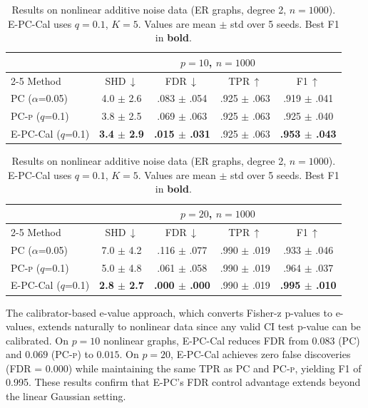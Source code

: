 \documentclass[11pt]{article}
\newcommand{\epc}{\textsc{E-PC}}
\newcommand{\pcp}{\textsc{PC-p}}
\begin{document}
\begin{table}[t]
\caption{Results on nonlinear additive noise data (ER graphs, degree 2, $n = 1000$). \epc{}-Cal uses $q = 0.1$, $K = 5$. Values are mean $\pm$ std over 5 seeds. Best F1 in \textbf{bold}.}
\label{tab:nonlinear}
\centering
\small
\begin{tabular}{l cccc}
\toprule
 & \multicolumn{4}{c}{$p = 10$, $n = 1000$} \\
\cmidrule(lr){2-5}
Method & SHD\,$\downarrow$ & FDR\,$\downarrow$ & TPR\,$\uparrow$ & F1\,$\uparrow$ \\
\midrule
PC ($\alpha$=0.05) & 4.0 $\pm$ 2.6 & .083 $\pm$ .054 & .925 $\pm$ .063 & .919 $\pm$ .041 \\
\pcp{} ($q$=0.1) & 3.8 $\pm$ 2.5 & .069 $\pm$ .063 & .925 $\pm$ .063 & .925 $\pm$ .040 \\
\epc{}-Cal ($q$=0.1) & \textbf{3.4 $\pm$ 2.9} & \textbf{.015 $\pm$ .031} & .925 $\pm$ .063 & \textbf{.953 $\pm$ .043} \\
\bottomrule
\end{tabular}

\vspace{0.5em}

\begin{tabular}{l cccc}
\toprule
 & \multicolumn{4}{c}{$p = 20$, $n = 1000$} \\
\cmidrule(lr){2-5}
Method & SHD\,$\downarrow$ & FDR\,$\downarrow$ & TPR\,$\uparrow$ & F1\,$\uparrow$ \\
\midrule
PC ($\alpha$=0.05) & 7.0 $\pm$ 4.2 & .116 $\pm$ .077 & .990 $\pm$ .019 & .933 $\pm$ .046 \\
\pcp{} ($q$=0.1) & 5.0 $\pm$ 4.8 & .061 $\pm$ .058 & .990 $\pm$ .019 & .964 $\pm$ .037 \\
\epc{}-Cal ($q$=0.1) & \textbf{2.8 $\pm$ 2.7} & \textbf{.000 $\pm$ .000} & .990 $\pm$ .019 & \textbf{.995 $\pm$ .010} \\
\bottomrule
\end{tabular}
\end{table}

The calibrator-based e-value approach, which converts Fisher-z p-values to e-values, extends naturally to nonlinear data since any valid CI test p-value can be calibrated. On $p = 10$ nonlinear graphs, \epc{}-Cal reduces FDR from $0.083$ (PC) and $0.069$ (\pcp{}) to $0.015$. On $p = 20$, \epc{}-Cal achieves zero false discoveries (FDR = 0.000) while maintaining the same TPR as PC and \pcp{}, yielding F1 of 0.995. These results confirm that \epc{}'s FDR control advantage extends beyond the linear Gaussian setting.
\end{document}

